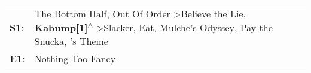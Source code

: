 \begin{supertabular}{p{0.03\textwidth}p{0.92\textwidth}}
 \textbf{S1}:  &  The Bottom Half\textsuperscript{}, \enspace Out Of Order\textsuperscript{} \textgreater \enspace Believe the Lie\textsuperscript{}, \enspace \textbf{Kabump[1]\textsuperscript{$\wedge$}} \textgreater \enspace Slacker\textsuperscript{}, \enspace Eat\textsuperscript{}, \enspace Mulche's Odyssey\textsuperscript{}, \enspace Pay the Snucka\textsuperscript{}, 's Theme\textsuperscript{}  \enspace  \\
 \textbf{E1}:  &                                                                                                                                                                                                                                                                                                                                                                       Nothing Too Fancy\textsuperscript{}  \enspace  \\
\end{supertabular}
